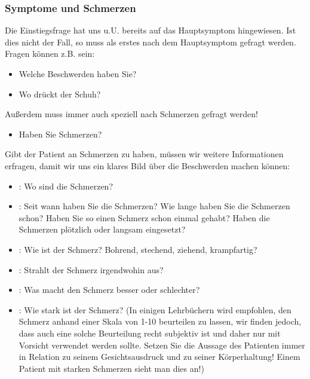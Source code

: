 \subsubsection{Symptome und Schmerzen}
Die Einstiegsfrage hat uns u.U. bereits auf das Hauptsymptom hingewiesen. Ist dies nicht der Fall, so muss als erstes nach dem Hauptsymptom gefragt werden. Fragen können z.B. sein:
\begin{itemize}
\item Welche Beschwerden haben Sie?
\item Wo drückt der Schuh?
\end{itemize}
Außerdem muss immer auch speziell nach Schmerzen gefragt werden!
\begin{itemize}
\item Haben Sie Schmerzen?
\end{itemize}
Gibt der Patient an Schmerzen zu haben, m\"ussen wir weitere Informationen erfragen, damit wir uns ein klares Bild \"uber die Beschwerden machen können:
\begin{itemize}
\item {}: Wo sind die Schmerzen?
\item {}: Seit wann haben Sie die Schmerzen? Wie lange haben Sie die Schmerzen schon? Haben Sie so einen Schmerz schon einmal gehabt? Haben die Schmerzen plötzlich oder langsam eingesetzt?
\item {}: Wie ist der Schmerz? Bohrend, stechend, ziehend, krampfartig?
\item {}: Strahlt der Schmerz irgendwohin aus?
\item {}: Was macht den Schmerz besser oder schlechter?
\item {}: Wie stark ist der Schmerz? (In einigen Lehrbüchern wird empfohlen, den Schmerz anhand einer Skala von 1-10 beurteilen zu lassen, wir finden jedoch, dass auch eine solche Beurteilung recht subjektiv ist und daher nur mit Vorsicht verwendet werden sollte. Setzen Sie die Aussage des Patienten immer in Relation zu seinem Gesichtsausdruck und zu seiner Körperhaltung! Einem Patient mit starken Schmerzen sieht man dies an!)
\end{itemize}

